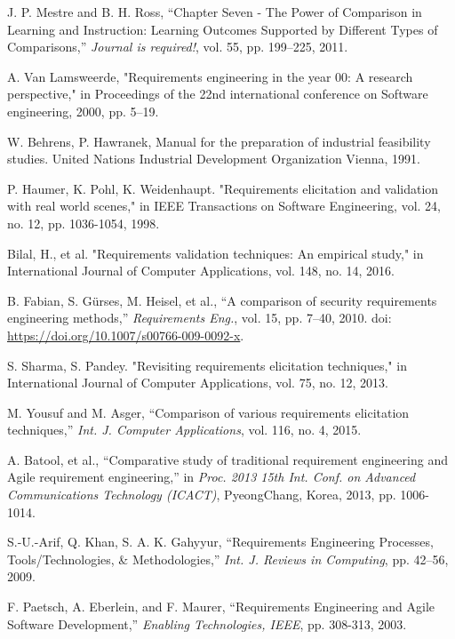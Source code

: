 \documentclass[conference]{IEEEtran}
\begin{document}
\begin{thebibliography}{00}

 J. P. Mestre and B. H. Ross, ``Chapter Seven - The Power of Comparison in Learning and Instruction: Learning Outcomes Supported by Different Types of Comparisons,'' \textit{Journal is required!}, vol. 55, pp. 199–225, 2011.

 A. Van Lamsweerde, "Requirements engineering in the year 00: A research perspective," in Proceedings of the 22nd international conference on Software engineering, 2000, pp. 5–19.

 W. Behrens, P. Hawranek, Manual for the preparation of industrial feasibility studies. United Nations Industrial Development Organization Vienna, 1991.

 P. Haumer, K. Pohl, K. Weidenhaupt. "Requirements elicitation and validation with real world scenes," in IEEE Transactions on Software Engineering, vol. 24, no. 12, pp. 1036-1054, 1998.

 Bilal, H., et al. "Requirements validation techniques: An empirical study," in International Journal of Computer Applications, vol. 148, no. 14, 2016.

 B. Fabian, S. Gürses, M. Heisel, et al., ``A comparison of security requirements engineering methods,'' \textit{Requirements Eng.}, vol. 15, pp. 7--40, 2010. doi: \url{https://doi.org/10.1007/s00766-009-0092-x}.

 S. Sharma, S. Pandey. "Revisiting requirements elicitation techniques," in International Journal of Computer Applications, vol. 75, no. 12, 2013.

 M. Yousuf and M. Asger, ``Comparison of various requirements elicitation techniques,'' \textit{Int. J. Computer Applications}, vol. 116, no. 4, 2015.

 A. Batool, et al., ``Comparative study of traditional requirement engineering and Agile requirement engineering,'' in \textit{Proc. 2013 15th Int. Conf. on Advanced Communications Technology (ICACT)}, PyeongChang, Korea, 2013, pp. 1006-1014.

 S.-U.-Arif, Q. Khan, S. A. K. Gahyyur, ``Requirements Engineering Processes, Tools/Technologies, \& Methodologies,'' \textit{Int. J. Reviews in Computing}, pp. 42–56, 2009.

 F. Paetsch, A. Eberlein, and F. Maurer, ``Requirements Engineering and Agile Software Development,'' \textit{Enabling Technologies, IEEE}, pp. 308-313, 2003.


\end{thebibliography}
\end{document}
